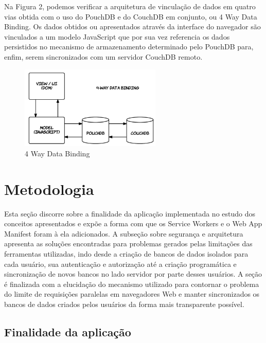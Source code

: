 \documentclass[
	article,			%
	11pt,				%
	oneside,			%
	a4paper,			%
	english,			%
	brazil,				%
	sumario=tradicional
	]{abntex2}
\begin{document}
Na Figura 2, podemos verificar a arquitetura de vinculação de dados em quatro vias obtida com o uso do PouchDB e do CouchDB em conjunto, ou 4 Way Data Binding. Os dados obtidos ou apresentados através da interface do navegador são vinculados a um modelo JavaScript que por sua vez referencia os dados persistidos no mecanismo de armazenamento determinado pelo PouchDB para, enfim, serem sincronizados com um servidor CouchDB remoto.

\begin{figure}[H]
	\label{4 Way Data Binding}
	\centering
	\caption{4 Way Data Binding}
	\includegraphics[width=0.6\textwidth]{figures/4way-binding}
\end{figure}


\section{Metodologia}

Esta seção discorre sobre a finalidade da aplicação implementada no estudo dos conceitos apresentados e expõe a forma com que os Service Workers e o Web App Manifest foram à ela adicionados. A subseção sobre segurança e arquitetura apresenta as soluções encontradas para problemas gerados pelas limitações das ferramentas utilizadas, indo desde a criação de bancos de dados isolados para cada usuário, sua autenticação e autorização até a criação programática e sincronização de novos bancos no lado servidor por parte desses usuários. A seção é finalizada com a elucidação do mecanismo utilizado para contornar o problema do limite de requisições paralelas em navegadores Web e manter sincronizados os bancos de dados criados pelos usuários da forma mais transparente possível.

\subsection{Finalidade da aplicação}
\end{document}
